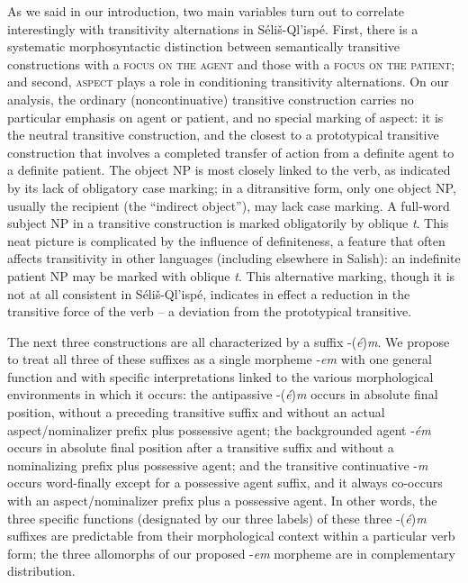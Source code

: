 \documentclass[output=paper,colorlinks,citecolor=brown]{langscibook}
\begin{document}
As we said in our introduction, two main variables turn out to
correlate interestingly with transitivity alternations in
S\'eli\v{s}-Ql'isp\'e.  First, there is a systematic morphosyntactic
distinction between semantically transitive constructions with a
\textsc{focus on the agent} and those with a \textsc{focus on the
patient}; and second, \textsc{aspect} plays a role in conditioning
transitivity alternations.  On our analysis, the ordinary
(noncontinuative) transitive construction carries no particular
emphasis on agent or patient, and no special marking of aspect: it is
the neutral transitive construction, and the closest to a prototypical
transitive construction that involves a completed transfer of action
from a definite agent to a definite patient.  The object NP is most
closely linked to the verb, as indicated by its lack of obligatory
case marking; in a ditransitive form, only one object NP, usually the
recipient (the ``indirect object''), may lack case marking.  A
full-word subject NP in a transitive construction is marked
obligatorily by oblique \emph{t}.  This neat picture is complicated by
the influence of definiteness, a feature that often affects
transitivity in other languages (including elsewhere in Salish): an
indefinite patient NP may be marked with oblique \emph{t}.  This
alternative marking, though it is not at all consistent in
S\'eli\v{s}-Ql'isp\'e, indicates in effect a reduction in the
transitive force of the verb -- a deviation from the prototypical
transitive.


The next three constructions are all characterized by a suffix
-(\emph{\'e})\emph{m}.  We propose to treat all three of these
suffixes as a single morpheme -\emph{em} with one general function and
with specific interpretations linked to the various morphological
environments in which it occurs: the antipassive -(\emph{\'e})\emph{m}
occurs in absolute final position, without a preceding transitive
suffix and without an actual aspect/nominalizer prefix plus possessive
agent; the backgrounded agent -\emph{\'em} occurs in absolute final
position after a transitive suffix and without a nominalizing prefix
plus possessive agent; and the transitive continuative -\emph{m}
occurs word-finally except for a possessive agent suffix, and it
always co-occurs with an aspect/nominalizer prefix plus a possessive
agent.  In other words, the three specific functions (designated by
our three labels) of these three -(\emph{\'e})\emph{m}  suffixes are
 predictable from their morphological context within a particular
 verb form; the three allomorphs of our proposed -\emph{em}
 morpheme are in complementary distribution.\largerpage
\end{document}
